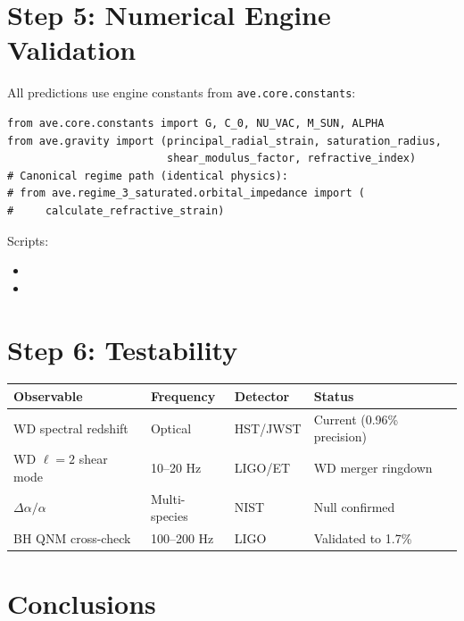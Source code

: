 \section{Step 5: Numerical Engine Validation}

All predictions use engine constants from \texttt{ave.core.constants}:
\begin{verbatim}
from ave.core.constants import G, C_0, NU_VAC, M_SUN, ALPHA
from ave.gravity import (principal_radial_strain, saturation_radius,
                         shear_modulus_factor, refractive_index)
# Canonical regime path (identical physics):
# from ave.regime_3_saturated.orbital_impedance import (
#     calculate_refractive_strain)
\end{verbatim}

Scripts:
\begin{itemize}
    \item {}
    \item {}
\end{itemize}

\section{Step 6: Testability}

\begin{center}
\begin{tabularx}{\textwidth}{@{}lllX@{}}
\toprule
\textbf{Observable} & \textbf{Frequency} & \textbf{Detector} & \textbf{Status} \\
\midrule
WD spectral redshift    & Optical        & HST/JWST   & Current (0.96\% precision) \\
WD $\ell=2$ shear mode  & 10--20 Hz      & LIGO/ET    & WD merger ringdown \\
$\Delta\alpha/\alpha$   & Multi-species  & NIST       & Null confirmed \\
BH QNM cross-check      & 100--200 Hz    & LIGO       & Validated to 1.7\% \\
\bottomrule
\end{tabularx}
\end{center}

\section{Conclusions}

